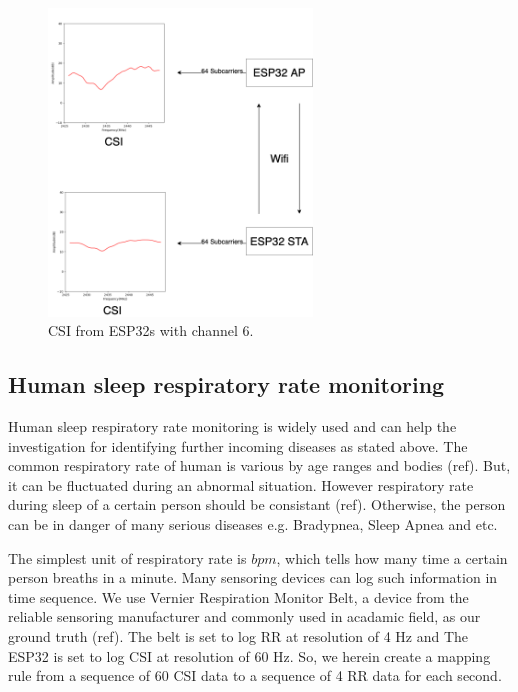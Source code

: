 \documentclass[10pt,letterpaper]{article}
\begin{document}
	
	\begin{figure}[htbp]
		
		\centerline{\includegraphics[width=70mm,scale=0.5]{ESP32CSI01.png}}
		\caption{CSI from ESP32s with channel 6.}
		\label{fig:ESP32CSI01}
	\end{figure}
	

	
		\subsection*{Human sleep respiratory rate monitoring}\label{HUMANSLEEPRR}
	Human sleep respiratory rate monitoring is widely used and can help the investigation for identifying further incoming diseases as stated above. The common respiratory rate of human is various by age ranges and bodies (ref). But, it can be fluctuated during an abnormal situation.  However respiratory rate during sleep of a certain person should be consistant (ref). Otherwise, the person can be in danger of many serious diseases e.g. Bradypnea, Sleep Apnea and etc. 
	
	The simplest unit of respiratory rate is $bpm$, which tells how many time a certain person breaths in a minute. Many sensoring devices can log such information in time sequence. We use Vernier Respiration Monitor Belt, a device from the reliable sensoring manufacturer and commonly used in acadamic field, as our ground truth (ref). The belt is set to log RR at resolution of 4 Hz and The ESP32 is set to log CSI at resolution of 60 Hz. So, we herein create a mapping rule from a sequence of 60 CSI data to a sequence of 4 RR data for each second.
	
\end{document}
